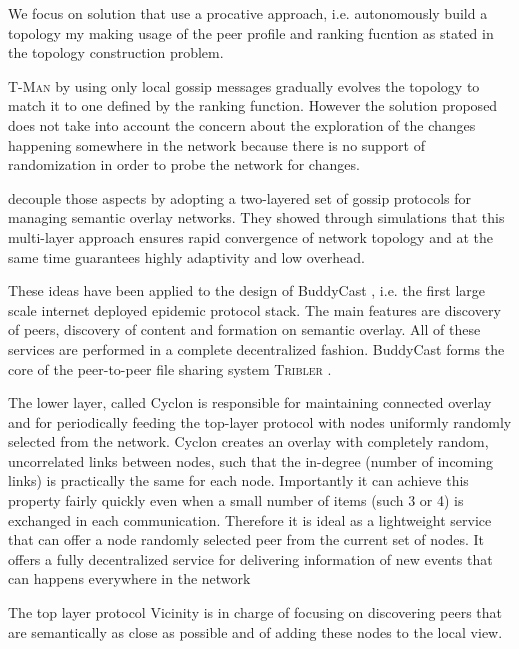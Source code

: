We focus on solution that use a procative approach, i.e. autonomously build a topology my making usage of the peer profile and ranking fucntion as stated in the topology construction problem.

\textsc{T-Man} \cite{JB04} by using only local gossip messages gradually evolves the topology to match it to one defined by the ranking function. However the solution proposed does not take into account the concern about the exploration of the changes happening somewhere in the network because there is no support of randomization in order to probe the network for changes.

\cite{VS05, VSI06} decouple those aspects by adopting a two-layered set of gossip protocols for managing semantic overlay networks. They showed through simulations that this multi-layer approach ensures rapid convergence of network topology and at the same time guarantees highly adaptivity and low overhead.

These ideas have been applied to the design of BuddyCast \cite{PYM+08}, i.e. the first large scale internet deployed epidemic protocol stack. The main features are discovery of peers, discovery of content and formation on semantic overlay. All of these services are performed in a complete decentralized fashion. BuddyCast forms the core of the peer-to-peer file sharing system \textsc{Tribler} \cite{PGW+08}.

The lower layer, called Cyclon is responsible for maintaining connected overlay and for periodically feeding the top-layer protocol with nodes uniformly randomly selected from the network. Cyclon creates an overlay with completely random, uncorrelated links between nodes, such that the in-degree (number of incoming links) is practically the same for each node. Importantly it can achieve this property fairly quickly even when a small number of items (such 3 or 4) is exchanged in each communication. Therefore it is ideal as a lightweight service that can offer a node randomly selected peer from the current set of nodes. It offers a fully decentralized service for delivering information of new events that can happens everywhere in the network

The top layer protocol Vicinity is in charge of focusing on discovering peers that are semantically as close as possible and of adding these nodes to the local view.

